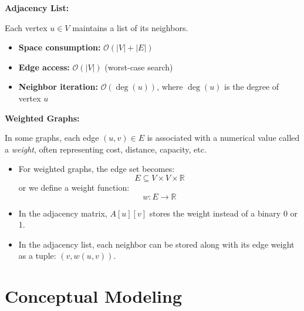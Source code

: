 \documentclass{article}
\begin{document}
\textbf{Adjacency List:}

Each vertex \( u \in V \) maintains a list of its neighbors.

\begin{itemize}
    \item \textbf{Space consumption:} \( \mathcal{O}(|V| + |E|) \)
    \item \textbf{Edge access:} \( \mathcal{O}(|V|) \) (worst-case search)
    \item \textbf{Neighbor iteration:} \( \mathcal{O}(\deg(u)) \), where \( \deg(u) \) is the degree of vertex \( u \)
\end{itemize}

    \textbf{Weighted Graphs:}  

    In some graphs, each edge \( (u, v) \in E \) is associated with a numerical value called a \textit{weight}, often representing cost, distance, capacity, etc.
    
    \begin{itemize}
        \item For weighted graphs, the edge set becomes:  
        \[
        E \subseteq V \times V \times \mathbb{R}
        \]
        or we define a weight function:  
        \[
        w : E \rightarrow \mathbb{R}
        \]
        \item In the adjacency matrix, \( A[u][v] \) stores the weight instead of a binary 0 or 1.
        \item In the adjacency list, each neighbor can be stored along with its edge weight as a tuple: \( (v, w(u, v)) \).
    \end{itemize}   
    
\section*{Conceptual Modeling}




\end{document}
